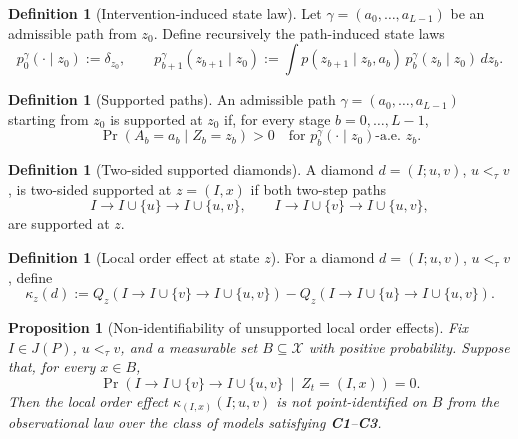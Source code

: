 \documentclass{article}
\newtheorem{proposition}[theorem]{Proposition}
\theoremstyle{definition}
\newtheorem{definition}[theorem]{Definition}
\begin{document}
\begin{definition}[Intervention-induced state law]
Let
$
\gamma=(a_0,\dots,a_{L-1})
$
be an admissible path from \(z_0\). Define recursively the path-induced state laws
\begin{equation}
\textstyle p_0^\gamma(\cdot\mid z_0):=\delta_{z_0},
\qquad
p_{b+1}^\gamma(z_{b+1}\mid z_0)
:=
\int p(z_{b+1}\mid z_b,a_b)\,p_b^\gamma(z_b\mid z_0)\,dz_b.
\label{eq:path-induced-state-law}
\end{equation}
\end{definition}

\begin{definition}[Supported paths]
An admissible path
$
\gamma=(a_0,\dots,a_{L-1})
$
starting from \(z_0\) is {supported at \(z_0\)} if, for every stage \(b=0,\dots,L-1\),
\begin{equation}
\Pr(A_b=a_b\mid Z_b=z_b)>0
\quad\text{for }p_b^\gamma(\cdot\mid z_0)\text{-a.e. }z_b.
\label{eq:path-support}
\end{equation}
\end{definition}

\begin{definition}[Two-sided supported diamonds]
A diamond \(d=(I;u,v)\), \(u<_{\tau}v\), is {two-sided supported at \(z=(I,x)\)} if both two-step paths
\[
I\to I\cup\{u\}\to I\cup\{u,v\},
\qquad
I\to I\cup\{v\}\to I\cup\{u,v\},
\]
are supported at \(z\).
\end{definition}

\begin{definition}[Local order effect at state \(z\)]
For a diamond \(d=(I;u,v)\), \(u<_{\tau}v\), define
\begin{equation}
\kappa_z(d)
:=
Q_z\!\left(I\to I\cup\{v\}\to I\cup\{u,v\}\right)
-
Q_z\!\left(I\to I\cup\{u\}\to I\cup\{u,v\}\right).
\label{eq:local-order-effect}
\end{equation}
\end{definition}

\begin{proposition}[Non-identifiability of unsupported local order effects]
\label{prop:nonid-main}
Fix \(I\in J(P)\), \(u<_{\tau}v\), and a measurable set \(B\subseteq \mathcal X\) with positive probability. Suppose that, for every \(x\in B\),
\[
\Pr\!\left(
I\to I\cup\{v\}\to I\cup\{u,v\}
\ \middle|\ 
Z_t=(I,x)
\right)=0.
\]
Then the local order effect \(\kappa_{(I,x)}(I;u,v)\) is not point-identified on \(B\) from the observational law over the class of models satisfying \textbf{C1}--\textbf{C3}.
\end{proposition}
\end{document}
